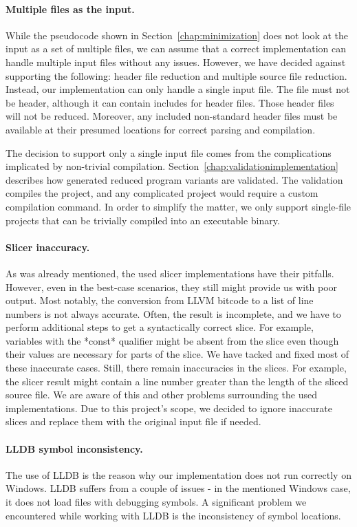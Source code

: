 \paragraph{Multiple files as the input.}
While the pseudocode shown in Section~\ref{chap:minimization} does not look 
at the input as a set of multiple files, we can assume that a correct 
implementation can handle multiple input files without any issues. 
However, we have decided against supporting the following: header file 
reduction and multiple source file reduction. 
Instead, our implementation can only handle a single input file.
The file must not be header, although it can contain includes for header 
files. 
Those header files will not be reduced. 
Moreover, any included non-standard header files must be available at their 
presumed locations for correct parsing and compilation.

The decision to support only a single input file comes from 
the complications implicated by non-trivial compilation. 
Section~\ref{chap:validationimplementation} describes how generated reduced 
program variants are validated. 
The validation compiles the project, and any complicated project would 
require a custom compilation command. 
In order to simplify the matter, we only support single-file projects that 
can be trivially compiled into an executable binary.

\paragraph{Slicer inaccuracy.}
As was already mentioned, the used slicer implementations have their 
pitfalls. 
However, even in the best-case scenarios, they still might provide us with 
poor output. 
Most notably, the conversion from LLVM bitcode to a list of line numbers is 
not always accurate. 
Often, the result is incomplete, and we have to perform additional steps to 
get a syntactically correct slice. 
For example, variables with the *const* qualifier might be absent from 
the slice even though their values are necessary for parts of the slice. 
We have tacked and fixed most of these inaccurate cases. 
Still, there remain inaccuracies in the slices. 
For example, the slicer result might contain a line number greater than 
the length of the sliced source file. 
We are aware of this and other problems surrounding the used implementations. 
Due to this project's scope, we decided to ignore inaccurate slices and 
replace them with the original input file if needed.

\paragraph{LLDB symbol inconsistency.}
The use of LLDB is the reason why our implementation does not run correctly 
on Windows. 
LLDB suffers from a couple of issues - in the mentioned Windows case, it does 
not load files with debugging symbols.
A significant problem we encountered while working with LLDB is 
the inconsistency of symbol locations. 

